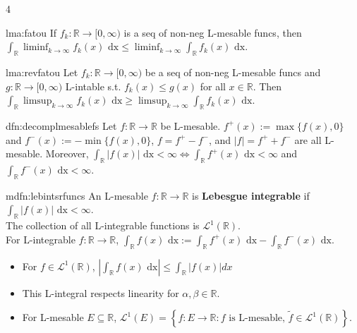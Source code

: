 \documentclass[landscape, 8pt]{extarticle}
\begin{document}
\begin{multicols*}{4}
		
		\begin{lma}{lma:fatou}{ }
			If $f_k : \mathbb{R} \to [0, \infty)$ is a seq of non-neg L-mesable funcs, then $\int_{\mathbb{R}}\liminf_{k\to \infty} f_k(x) \text{ dx} \le \liminf_{k\to \infty}\int_{\mathbb{R}}f_k(x) \text{ dx}$.
			
		\end{lma}
		
		
		\begin{lma}{lma:revfatou}{ }
			Let $f_k: \mathbb{R} \to [0, \infty)$ be a seq of non-neg L-mesable funcs and $g: \mathbb{R} \to [0, \infty)$ L-intable s.t. $f_k(x) \le g(x)$ for all $x\in \mathbb{R}$. Then $\int_{\mathbb{R}} \limsup_{k \to \infty} f_k(x) \text{ dx} \ge \limsup_{k \to \infty}\int_{\mathbb{R}}f_k(x) \text{ dx}$.
			
		\end{lma}
		
		
		\begin{dfn-s}{dfn:decomplmesablefs}{ }
			Let $f : \mathbb{R} \to \mathbb{R}$ be L-mesable. $f^+ (x) := \max\{f(x), 0\}$ and $f^-(x) := -\min\{f(x), 0\}$, $f = f^+ - f^-$, and $\left|f\right| = f^+ + f^-$ are all L-mesable. Moreover, $\int_{\mathbb{R}}\left|f(x)\right| \text{ dx} < \infty \iff \int_{\mathbb{R}}f^+ (x) \text{ dx} < \infty$ and $ \int_{\mathbb{R}}f^- (x) \text{ dx} < \infty$.
			
		\end{dfn-s}
		
		
		\begin{mdfn-s}{mdfn:lebintsrfuncs}{ }
			An L-mesable $f: \mathbb{R} \to \mathbb{R}$ is \textbf{Lebesgue integrable} if $\int_{\mathbb{R}}\left|f(x)\right| \text{ dx} < \infty$.\\
			The collection of all L-integrable functions is $\mathcal{L}^1(\mathbb{R})$.\\
			For L-integrable $f: \mathbb{R} \to \mathbb{R}$, $\int_{\mathbb{R}}f(x) \text{ dx} := \int_{\mathbb{R}}f^+ (x) \text{ dx} - \int_{\mathbb{R}}f^- (x) \text{ dx}$.
			\begin{itemize}
				\item For $f\in \mathcal{L}^1(\mathbb{R})$, $\left|\int_{\mathbb{R}}f(x) \text{ dx}\right| \le \int_{\mathbb{R}}\left|f(x) \right|dx$
				\item This L-integral respects linearity for $\alpha, \beta\in \mathbb{R}$.
				\item For L-mesable $E \subseteq \mathbb{R}$, $\mathcal{L}^1(E) = \left\{f: E \to \mathbb{R} : \text{$f$ is L-mesable, }\tilde{f}\in \mathcal{L}^1(\mathbb{R})\right\}$.
			\end{itemize}
			

\end{mdfn-s}
\end{multicols*}
\end{document}

